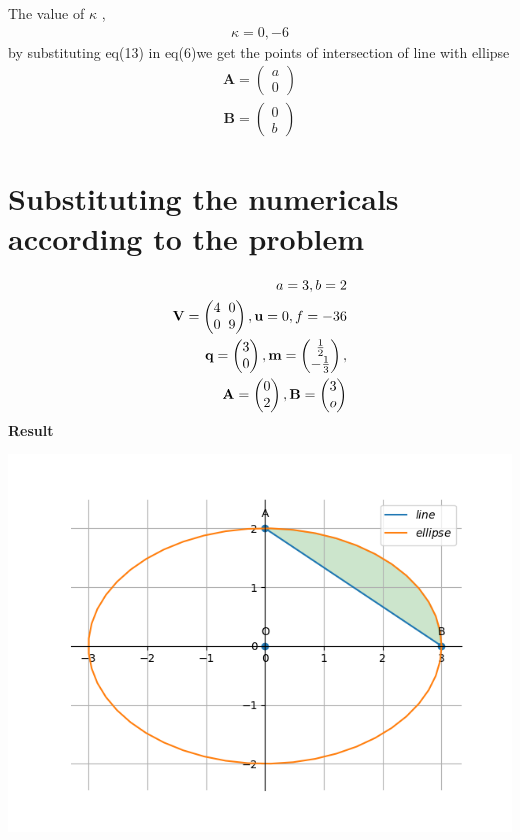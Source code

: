 \documentclass[10pt,a4paper]{report}
\newcommand{\myvec}[1]{\ensuremath{\begin{pmatrix}#1\end{pmatrix}}}
\let\vec\mathbf
\let\vec\mathbf
\begin{document}
\begin{multicols}{2}
The value of $\kappa$ ,\\
\begin{align}
    \kappa =0,-6
\end{align}
by substituting eq(13) in eq(6)we get the
points of intersection of line with ellipse \\
\begin{align}
    \vec{A}=\myvec{
a\\
0
    }
\end{align}
\begin{align}
    \vec{B}=\myvec{
0\\
b
    }
\end{align}
\section{Substituting the numericals according to the problem}
\begin{align}
a=3, \vspace{2mm}
b=2\\
\vec{\textbf{V}}=\myvec{4\hspace{2mm}0\\ 0 \hspace{2mm} 9}, \vspace{2mm}
\vec{\textbf{u}}=0, \vspace{2mm}
f = -36\\
\vec{\textbf{q}}=\myvec{3\\0}, \vspace{2mm}
\vec{\textbf{m}}=\myvec{\frac{1}{2}\\-\frac{1}{3}}, \vspace{2mm}\\
\vec{\textbf{A}}=\myvec{0\\2}, \vspace{2mm}
\vec{\textbf{B}}=\myvec{3\\o}
\end{align}
\textbf{Result}
\begin{center}
 \includegraphics[scale=0.5]{conic_fig.png}    

\end{center}
\end{multicols}
\end{document}
